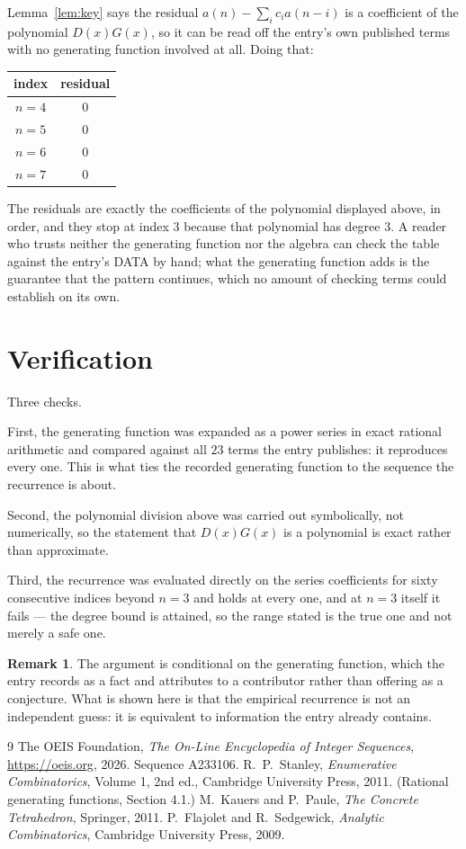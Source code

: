 \documentclass[11pt,a4paper]{article}
\theoremstyle{plain}
\theoremstyle{definition}
\newtheorem{remark}[theorem]{Remark}
\begin{document}
Lemma~\ref{lem:key} says the residual $a(n)-\sum_ic_ia(n-i)$ is a coefficient of the
polynomial $D(x)G(x)$, so it can be read off the entry's own published terms with no
generating function involved at all. Doing that:
\begin{center}
\begin{tabular}{cc}
index & residual \\ \hline
$n=4$ & $0$ \\
$n=5$ & $0$ \\
$n=6$ & $0$ \\
$n=7$ & $0$
\end{tabular}
\end{center}
The residuals are exactly the coefficients of the polynomial displayed above, in order, and
they stop at index $3$ because that polynomial has degree $3$. A reader who trusts
neither the generating function nor the algebra can check the table against the entry's DATA
by hand; what the generating function adds is the guarantee that the pattern continues, which
no amount of checking terms could establish on its own.

\section{Verification}

Three checks.

First, the generating function was expanded as a power series in exact rational arithmetic and
compared against all $23$ terms the entry publishes: it reproduces every one. This is
what ties the recorded generating function to the sequence the recurrence is about.

Second, the polynomial division above was carried out symbolically, not numerically, so the
statement that $D(x)G(x)$ is a polynomial is exact rather than approximate.

Third, the recurrence was evaluated directly on the series coefficients for sixty consecutive
indices beyond $n=3$ and holds at every one, and at $n=3$ itself it fails --- the
degree bound is attained, so the range stated is the true one and not merely a safe one.

\begin{remark}
The argument is conditional on the generating function, which the entry records as a fact and
attributes to a contributor rather than offering as a conjecture. What is shown here is that
the empirical recurrence is not an independent guess: it is equivalent to information the
entry already contains.
\end{remark}

\begin{thebibliography}{9}
 The OEIS Foundation, \emph{The On-Line Encyclopedia of Integer
Sequences}, \url{https://oeis.org}, 2026. Sequence A233106.
 R.~P.~Stanley, \emph{Enumerative Combinatorics}, Volume 1, 2nd ed.,
Cambridge University Press, 2011. (Rational generating functions, Section 4.1.)
 M.~Kauers and P.~Paule, \emph{The Concrete Tetrahedron}, Springer, 2011.
 P.~Flajolet and R.~Sedgewick, \emph{Analytic Combinatorics}, Cambridge
University Press, 2009.
\end{thebibliography}
\end{document}
